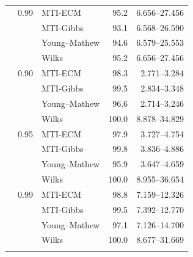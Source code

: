 \begin{longtable}{@{}rrlrr@{}}
\addlinespace[0.3em]
500 & 0.99 & MTI-ECM & 95.2 & 6.656--27.456 \\
 &  & MTI-Gibbs & 93.1 & 6.568--26.590 \\
 &  & Young--Mathew & 94.6 & 6.579--25.553 \\
 &  & Wilks & 95.2 & 6.656--27.456 \\
\addlinespace[0.3em]
1000 & 0.90 & MTI-ECM & 98.3 & 2.771--3.284 \\
 &  & MTI-Gibbs & 99.5 & 2.834--3.348 \\
 &  & Young--Mathew & 96.6 & 2.714--3.246 \\
 &  & Wilks & 100.0 & 8.878--34.829 \\
\addlinespace[0.3em]
1000 & 0.95 & MTI-ECM & 97.9 & 3.727--4.754 \\
 &  & MTI-Gibbs & 99.8 & 3.836--4.886 \\
 &  & Young--Mathew & 95.9 & 3.647--4.659 \\
 &  & Wilks & 100.0 & 8.955--36.654 \\
\addlinespace[0.3em]
1000 & 0.99 & MTI-ECM & 98.8 & 7.159--12.326 \\
 &  & MTI-Gibbs & 99.5 & 7.392--12.770 \\
 &  & Young--Mathew & 97.1 & 7.126--14.700 \\
 &  & Wilks & 100.0 & 8.677--31.669 \\
\addlinespace[0.3em]
\end{longtable}
\clearpage
